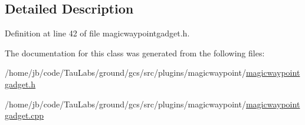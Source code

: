 \subsection{\-Detailed \-Description}


\-Definition at line 42 of file magicwaypointgadget.\-h.



\-The documentation for this class was generated from the following files\-:\begin{DoxyCompactItemize}
\item 
/home/jb/code/\-Tau\-Labs/ground/gcs/src/plugins/magicwaypoint/\hyperlink{magicwaypointgadget_8h}{magicwaypointgadget.\-h}\item 
/home/jb/code/\-Tau\-Labs/ground/gcs/src/plugins/magicwaypoint/\hyperlink{magicwaypointgadget_8cpp}{magicwaypointgadget.\-cpp}\end{DoxyCompactItemize}
